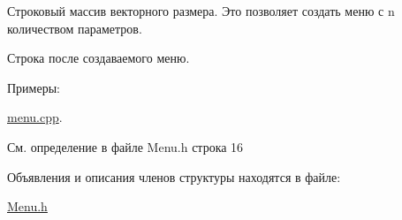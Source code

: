 Строковый массив векторного размера. Это позволяет создать меню с n количеством параметров. 

Строка после создаваемого меню. \begin{Desc}
\item[Примеры\+: ]\par
\hyperlink{menu_8cpp-example}{menu.\+cpp}.\end{Desc}


См. определение в файле Menu.\+h строка 16



Объявления и описания членов структуры находятся в файле\+:\begin{DoxyCompactItemize}
\item 
\hyperlink{_menu_8h}{Menu.\+h}\end{DoxyCompactItemize}
